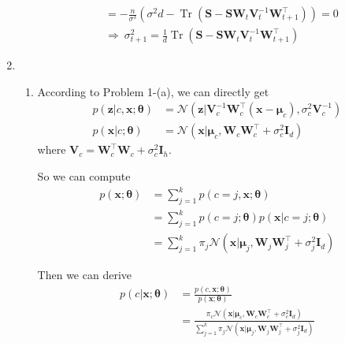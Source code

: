 \documentclass[11pt]{article}
\DeclareMathOperator{\tr}{Tr}
\begin{document}
\begin{enumerate}
\begin{enumerate}
\begin{align*}
    &= -\frac{n}{\sigma^3}\left(\sigma^2d-\tr\left(\bm S-\bm S\bm W_t\bm V_t^{-1}\bm W_{t+1}^{\top}\right)\right)=0 \\
    &\Rightarrow\ \sigma_{t+1}^2=\frac{1}{d}\tr\left(\bm S-\bm S\bm W_t\bm V_t^{-1}\bm W_{t+1}^{\top}\right)
    \end{align*}
\end{enumerate}
\item
    \begin{enumerate}
    \item
    According to Problem 1-(a), we can directly get
    \begin{align*}
    p(\bm z|c,\bm x;\bm\theta)
    &= \mathcal{N}(\bm z|\bm V_c^{-1}\bm W_c^{\top}(\bm x-\bm\mu_c),\sigma_c^2\bm V_c^{-1}) \\
    p(\bm x|c;\bm\theta)
    &= \mathcal{N}(\bm x|\bm\mu_c,\bm W_c\bm W_c^{\top}+\sigma_c^2\bm I_d)
    \end{align*}
    where $\bm V_c=\bm W_c^{\top}\bm W_c+\sigma_c^2\bm I_h$.
    
    So we can compute
    \begin{align*}
    p(\bm x;\bm\theta)
    &= \sum_{j=1}^{k}p(c=j,\bm x;\bm\theta) \\
    &= \sum_{j=1}^{k}p(c=j;\bm\theta)p(\bm x|c=j;\bm\theta) \\
    &= \sum_{j=1}^{k}\pi_j\mathcal{N}(\bm x|\bm\mu_j,\bm W_j\bm W_j^{\top}+\sigma_j^2\bm I_d)
    \end{align*}
    
    Then we can derive
    \begin{align*}
    p(c|\bm x;\bm\theta)
    &= \frac{p(c,\bm x;\bm\theta)}{p(\bm x;\bm\theta)} \\
    &= \frac{\pi_c\mathcal{N}(\bm x|\bm\mu_c,\bm W_c\bm W_c^{\top}+\sigma_c^2\bm I_d)}{\sum_{j=1}^{k}\pi_j\mathcal{N}(\bm x|\bm\mu_j,\bm W_j\bm W_j^{\top}+\sigma_j^2\bm I_d)}
    \end{align*}
    

\end{enumerate}
\end{enumerate}
\end{document}
